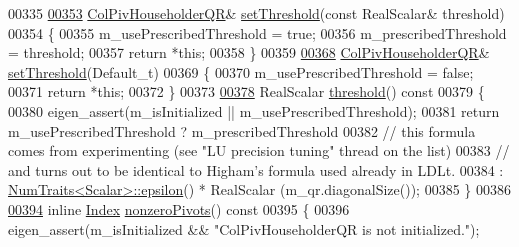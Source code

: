 \begin{DoxyCode}
00335 
\hyperlink{group___q_r___module_ae712cdc9f0e521cfc8061bee58ff55ee}{00353}     \hyperlink{group___q_r___module_class_eigen_1_1_col_piv_householder_q_r}{ColPivHouseholderQR}& \hyperlink{group___q_r___module_ae712cdc9f0e521cfc8061bee58ff55ee}{setThreshold}(\textcolor{keyword}{const} RealScalar& threshold)
00354     \{
00355       m\_usePrescribedThreshold = \textcolor{keyword}{true};
00356       m\_prescribedThreshold = threshold;
00357       \textcolor{keywordflow}{return} *\textcolor{keyword}{this};
00358     \}
00359 
\hyperlink{group___q_r___module_a648df14c457ceceb09d933d06d3bdded}{00368}     \hyperlink{group___q_r___module_class_eigen_1_1_col_piv_householder_q_r}{ColPivHouseholderQR}& \hyperlink{group___q_r___module_a648df14c457ceceb09d933d06d3bdded}{setThreshold}(Default\_t)
00369     \{
00370       m\_usePrescribedThreshold = \textcolor{keyword}{false};
00371       \textcolor{keywordflow}{return} *\textcolor{keyword}{this};
00372     \}
00373 
\hyperlink{group___q_r___module_a72276adb1aa11f870f50d0bd58af014d}{00378}     RealScalar \hyperlink{group___q_r___module_a72276adb1aa11f870f50d0bd58af014d}{threshold}()\textcolor{keyword}{ const}
00379 \textcolor{keyword}{    }\{
00380       eigen\_assert(m\_isInitialized || m\_usePrescribedThreshold);
00381       \textcolor{keywordflow}{return} m\_usePrescribedThreshold ? m\_prescribedThreshold
00382       \textcolor{comment}{// this formula comes from experimenting (see "LU precision tuning" thread on the list)}
00383       \textcolor{comment}{// and turns out to be identical to Higham's formula used already in LDLt.}
00384                                       : \hyperlink{group___core___module_struct_eigen_1_1_num_traits}{NumTraits<Scalar>::epsilon}() * RealScalar
      (m\_qr.diagonalSize());
00385     \}
00386 
\hyperlink{group___q_r___module_a796610bab81f0527aa1ae440c71f58a4}{00394}     \textcolor{keyword}{inline} \hyperlink{namespace_eigen_a62e77e0933482dafde8fe197d9a2cfde}{Index} \hyperlink{group___q_r___module_a796610bab81f0527aa1ae440c71f58a4}{nonzeroPivots}()\textcolor{keyword}{ const}
00395 \textcolor{keyword}{    }\{
00396       eigen\_assert(m\_isInitialized && \textcolor{stringliteral}{"ColPivHouseholderQR is not initialized."});

\end{DoxyCode}

